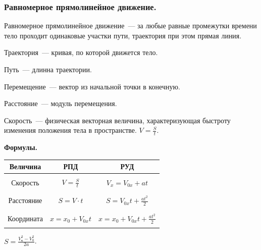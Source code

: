 \documentclass[12pt]{article}
\begin{document}
	\subsubsection{Равномерное прямолинейное движение.}
	\begin{definition}
		Равномерное прямолинейное движение~--- за любые равные промежутки времени тело проходит одинаковые участки пути, траектория при этом прямая линия.
	\end{definition}
	\begin{definition}
		Траектория~--- кривая, по которой движется тело.
	\end{definition}
	\begin{definition}
		Путь~--- длинна траектории.
	\end{definition}
	\begin{definition}
		Перемещение~--- вектор из начальной точки в конечную.
	\end{definition}
	\begin{definition}
		Расстояние~--- модуль перемещения.
	\end{definition}
	\begin{definition}
		Скорость~--- физическая векторная величина, характеризующая быстроту изменения положения тела в пространстве. $V = \frac{S}{t}$.
	\end{definition}
	\noindent
	\textbf{Формулы.} \\
	\begin{tabular}{|c|c|c|}
		\hline
		\textbf{Величина} & \textbf{РПД} & \textbf{РУД} \\
		\hline
		 & & \\
		Скорость & $V = \frac{S}{t}$ & $V_x = V_{0x} + at$ \\
		 & & \\
		\hline
		 & & \\
		Расстояние & $S = V \cdot t$ & $S = V_{0x}t + \frac{at^2}{2}$ \\
		 & & \\
		\hline
		 & & \\
		Координата & $x = x_0 + V_{0x}t$ & $x = x_0 + V_{0x}t + \frac{at^2}{2}$ \\
		 & & \\
		\hline
	\end{tabular}
	\begin{statement}
		$S = \frac{V_{\text{к}}^2 - V_0^2}{2a}$.
	\end{statement}
\end{document}
